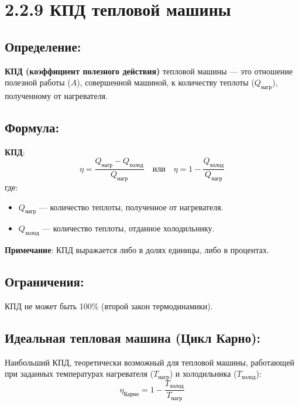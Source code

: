 \documentclass[a4paper,12pt]{article}
\begin{document}
\section*{2.2.9 КПД тепловой машины}
\vspace{-9pt}
\subsection*{Определение:}
\vspace{-3pt}
\textbf{КПД (коэффициент полезного действия)} тепловой машины — это отношение полезной работы ($A$), совершенной машиной, к количеству теплоты ($Q_{\text{нагр}}$), полученному от нагревателя.

\vspace{-9pt}
\subsection*{Формула:}
\vspace{-3pt}
\textbf{КПД}:
    $$ \eta = \frac{Q_{\text{нагр}} - Q_{\text{холод}}}{Q_{\text{нагр}}} \quad \text{или} \quad \eta = 1 - \frac{Q_{\text{холод}}}{Q_{\text{нагр}}} $$
    где:
\begin{itemize}
    \item $Q_{\text{нагр}}$ — количество теплоты, полученное от нагревателя.
    \item $Q_{\text{холод}}$ — количество теплоты, отданное холодильнику.
\end{itemize}
\vspace{-0.05em}
\textbf{Примечание}: КПД выражается либо в долях единицы, либо в процентах.


\vspace{-9pt}
\subsection*{Ограничения:}
\vspace{-3pt}
КПД не может быть 100\% (второй закон термодинамики).

\vspace{-9pt}
\subsection*{Идеальная тепловая машина (Цикл Карно):}
\vspace{-3pt}
Наибольший КПД, теоретически возможный для тепловой машины, работающей при заданных температурах нагревателя ($T_{\text{нагр}}$) и холодильника ($T_{\text{холод}}$):
\vspace{-0.05em}
$$ \eta_{\text{Карно}} = 1 - \frac{T_{\text{холод}}}{T_{\text{нагр}}} $$
\end{document}
